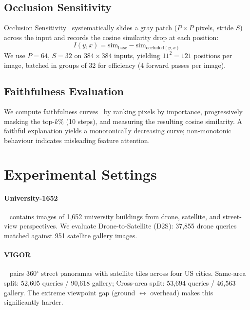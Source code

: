 \documentclass{article}
\begin{document}
\subsection{Occlusion Sensitivity}

Occlusion Sensitivity~\citep{zeiler2014visualizing} systematically slides a gray patch ($P{\times}P$ pixels, stride $S$) across the input and records the cosine similarity drop at each position:
\begin{equation}
    I(y, x) = \text{sim}_{\text{base}} - \text{sim}_{\text{occluded}(y,x)}
    \label{eq:occlusion}
\end{equation}
We use $P{=}64$, $S{=}32$ on $384{\times}384$ inputs, yielding $11^2{=}121$ positions per image, batched in groups of 32 for efficiency (4 forward passes per image).

\subsection{Faithfulness Evaluation}

We compute faithfulness curves~\citep{petsiuk2018rise} by ranking pixels by importance, progressively masking the top-$k\%$ (10 steps), and measuring the resulting cosine similarity.
A faithful explanation yields a monotonically decreasing curve; non-monotonic behaviour indicates misleading feature attention.

\section{Experimental Settings}
\label{sec:settings}

\paragraph{University-1652}~\citep{zheng2020university} contains images of 1,652 university buildings from drone, satellite, and street-view perspectives.
We evaluate Drone-to-Satellite (D2S): 37,855 drone queries matched against 951 satellite gallery images.

\paragraph{VIGOR}~\citep{zhu2021vigor} pairs 360$^\circ$ street panoramas with satellite tiles across four US cities.
Same-area split: 52,605 queries / 90,618 gallery; Cross-area split: 53,694 queries / 46,563 gallery.
The extreme viewpoint gap (ground $\leftrightarrow$ overhead) makes this significantly harder.
\end{document}
